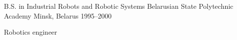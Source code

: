

\begin{cventries}

  \cventry
    {B.S. in Industrial Robots and Robotic Systems} %
    {Belarusian State Polytechnic Academy} %
    {Minsk, Belarus} %
    {1995--2000} %
    {
      \begin{cvitems} %
        \item {Robotics engineer}
      \end{cvitems}
    }

\end{cventries}
